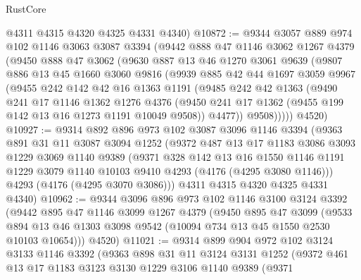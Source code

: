 \begin{lexlean}{RustCore}
\begin{coremodule}
      @4311
      @4315
      @4320
      @4325
      @4331
      @4340)
@10872 := @9344
    @3057
    @889
    @974
    @102
    @1146
    @3063
    @3087
    @3394
    (@9442
      @888
      @47
      @1146
      @3062
      @1267
      @4379
      (@9450
        @888
        @47
        @3062
        (@9630
          @887
          @13
          @46
          @1270
          @3061
          @9639
          (@9807
            @886
            @13
            @45
            @1660
            @3060
            @9816
            (@9939
              @885
              @42
              @44
              @1697
              @3059
              @9967
              (@9455
                @242
                @142
                @42
                @16
                @1363
                @1191
                (@9485
                  @242
                  @42
                  @1363
                  (@9490
                    @241
                    @17
                    @1146
                    @1362
                    @1276
                    @4376
                    (@9450 @241 @17 @1362 (@9455 @199 @142 @13 @16 @1273 @1191 @10049 @9508))
                    @4477))
                @9508)))))
      @4520)
@10927 := @9314
    @892
    @896
    @973
    @102
    @3087
    @3096
    @1146
    @3394
    (@9363
      @891
      @31
      @11
      @3087
      @3094
      @1252
      (@9372
        @487
        @13
        @17
        @1183
        @3086
        @3093
        @1229
        @3069
        @1140
        @9389
        (@9371
          @328
          @142
          @13
          @16
          @1550
          @1146
          @1191
          @1229
          @3079
          @1140
          @10103
          @9410
          @4293
          (@4176 (@4295 @3080 @1146)))
        @4293
        (@4176 (@4295 @3070 @3086)))
      @4311
      @4315
      @4320
      @4325
      @4331
      @4340)
@10962 := @9344
    @3096
    @896
    @973
    @102
    @1146
    @3100
    @3124
    @3392
    (@9442
      @895
      @47
      @1146
      @3099
      @1267
      @4379
      (@9450
        @895
        @47
        @3099
        (@9533 @894 @13 @46 @1303 @3098 @9542 (@10094 @734 @13 @45 @1550 @2530 @10103 @10654)))
      @4520)
@11021 := @9314
    @899
    @904
    @972
    @102
    @3124
    @3133
    @1146
    @3392
    (@9363
      @898
      @31
      @11
      @3124
      @3131
      @1252
      (@9372
        @461
        @13
        @17
        @1183
        @3123
        @3130
        @1229
        @3106
        @1140
        @9389
        (@9371

\end{coremodule}
\end{lexlean}
